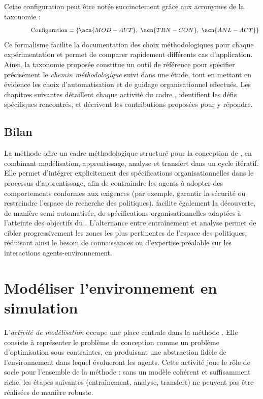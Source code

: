 Cette configuration peut être notée succinctement grâce aux acronymes de la taxonomie :
\[
  \hspace{1.5cm}\text{Configuration} = \{\acn{MOD-AUT},\ \acn{TRN-CON},\ \acn{ANL-AUT}\}
\]
Ce formalisme facilite la documentation des choix méthodologiques pour chaque expérimentation et permet de comparer rapidement différents cas d'application.
%
Ainsi, la taxonomie proposée constitue un outil de référence pour spécifier précisément le \textit{chemin méthodologique} suivi dans une étude, tout en mettant en évidence les choix d'automatisation et de guidage organisationnel effectués.
Les chapitres suivantes détaillent chaque activité du cadre , identifient les défis spécifiques rencontrés, et décrivent les contributions proposées pour y répondre.

\section{Bilan}
La méthode  offre un cadre méthodologique structuré pour la conception de , en combinant modélisation, apprentissage, analyse et transfert dans un cycle itératif. Elle permet d'intégrer explicitement des spécifications organisationnelles dans le processus d'apprentissage, afin de contraindre les agents à adopter des comportements conformes aux exigences (par exemple, garantir la sécurité ou restreindre l'espace de recherche des politiques).  facilite également la découverte, de manière semi-automatisée, de spécifications organisationnelles adaptées à l'atteinte des objectifs du . L'alternance entre entraînement et analyse permet de cibler progressivement les zones les plus pertinentes de l'espace des politiques, réduisant ainsi le besoin de connaissances ou d'expertise préalable sur les interactions agents-environnement.

\clearpage
\thispagestyle{empty}
\null
\newpage


\chapter{Modéliser l'environnement en simulation}
\label{chap:modelling}

L'\textit{activité de modélisation} occupe une place centrale dans la méthode .
Elle consiste à représenter le problème de conception comme un problème d'optimisation sous contraintes, en produisant une abstraction fidèle de l'environnement dans lequel évolueront les agents.
Cette activité joue le rôle de socle pour l'ensemble de la méthode : sans un modèle cohérent et suffisamment riche, les étapes suivantes (entraînement, analyse, transfert) ne peuvent pas être réalisées de manière robuste.

